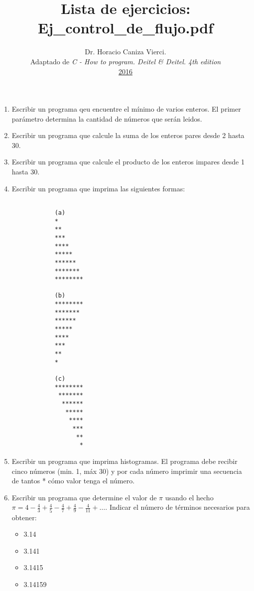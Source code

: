 \documentclass[12pt]{article}
\title{Lista de ejercicios: Ej\_control\_de\_flujo.pdf}
\author{
    Dr. Horacio Caniza Vierci.\\ 
    Adaptado de \emph{C - How to program. Deitel \& Deitel. 4th edition}\\
        \underline{2016}
}
\date{}
\begin{document}
\maketitle

    \begin{enumerate}
        \item Escribir un programa qeu encuentre el m\'inimo de varios enteros. El primer par\'ametro determina la cantidad
            de n\'umeros que ser\'an leidos.
        \item Escribir un programa que calcule la suma de los enteros pares desde 2 hasta 30.
        \item Escribir un programa que calcule el producto de los enteros impares desde 1 hasta 30.

        \item Escribir un programa que imprima las siguientes formas:
            \begin{verbatim}

            (a)
            *
            **
            ***
            ****
            *****
            ******
            *******
            ********

            (b)
            ********
            *******
            ******
            *****
            ****
            ***
            **
            *

            (c)
            ********
             *******
              ******
               *****
                ****
                 ***
                  **
                   *
            \end{verbatim}

        \item Escribir un programa que imprima histogramas. El programa debe recibir cinco n\'umeros (min. 1, m\'ax 30) y por cada n\'umero
            imprimir una secuencia de tantos * c\'omo valor tenga el n\'umero.

        \item Escribir un programa que determine el valor de $\pi$ usando el hecho  $ \pi = 4 - \frac{4}{3} + \frac{4}{5} - \frac{4}{7} + \frac{4}{9} -\frac{4}{11} + \ldots$. Indicar el n\'umero de t\'erminos necesarios para obtener: 
            \begin{itemize}
                \item 3.14
                \item 3.141
                \item 3.1415
                \item 3.14159
            \end{itemize}


\end{enumerate}
\end{document}
